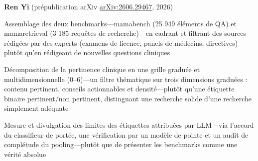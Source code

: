         \vspace{0.10 cm}
        \begin{onecolentry}
            \textbf{Ren Yi} (prépublication arXiv \href{https://arxiv.org/abs/2606.29467}{arXiv:2606.29467}, 2026)
        \end{onecolentry}
        \vspace{0.10 cm}

        \begin{onecolentry}
        \begin{highlights}
            \item Assemblage des deux benchmarks---mamabench (25 949 éléments de QA) et mamaretrieval (3 185 requêtes de recherche)---en cadrant et filtrant des sources rédigées par des experts (examens de licence, panels de médecins, directives) plutôt qu'en rédigeant de nouvelles questions cliniques
            \item Décomposition de la pertinence clinique en une grille graduée et multidimensionnelle (0--6)---un filtre thématique sur trois dimensions graduées : contenu pertinent, conseils actionnables et densité---plutôt qu'une étiquette binaire pertinent/non pertinent, distinguant une recherche solide d'une recherche simplement adéquate
            \item Mesure et divulgation des limites des étiquettes attribuées par LLM---via l'accord du classifieur de portée, une vérification par un modèle de pointe et un audit de complétude du pooling---plutôt que de présenter les benchmarks comme une vérité absolue
        \end{highlights}
        \end{onecolentry}
